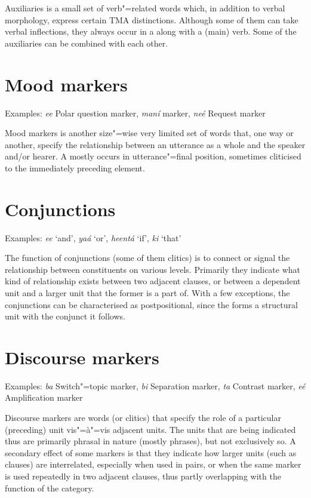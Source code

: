 Auxiliaries is a small set of verb"=related words which, in addition to verbal morphology, express certain TMA distinctions. Although some of them can take verbal inflections, they always occur in a  along with a (main) verb. Some of the auxiliaries can be combined with each other.


\section{Mood markers}
\label{sec:3b-11}
Examples: \textit{ee} Polar question marker, \textit{maní}  marker, \textit{neé} Request marker


Mood markers is another size"=wise very limited set of words that, one way or another, specify the relationship between an utterance as a whole and the speaker and/or hearer. A  mostly occurs in utterance"=final position, sometimes cliticised to the immediately preceding element.


\section{Conjunctions}
\label{sec:3b-12}
Examples: \textit{ee} `and', \textit{yaá} `or', \textit{heentá} `if', \textit{ki} `that'


The function of conjunctions (some of them clitics) is to connect or signal the relationship between constituents on various levels. Primarily they indicate what kind of relationship exists between two adjacent clauses, or between a dependent unit and a larger unit that the former is a part of. With a few exceptions, the conjunctions can be characterised as postpositional, since the  forms a structural unit with the conjunct it follows.


\section{Discourse markers}
\label{sec:3b-13}
Examples: \textit{ba} Switch"=topic marker, \textit{bi} Separation marker, \textit{ta} Contrast marker, \textit{eé} Amplification marker 


Discourse markers are words (or clitics) that specify the  role of a particular (preceding) unit vis"=à"=vis adjacent units. The units that are being indicated thus are primarily phrasal in nature (mostly  phrases), but not exclusively so. A secondary effect of some  markers is that they indicate how larger units (such as clauses) are interrelated, especially when used in pairs, or when the same marker is used repeatedly in two adjacent clauses, thus partly overlapping with the function of the  category.


